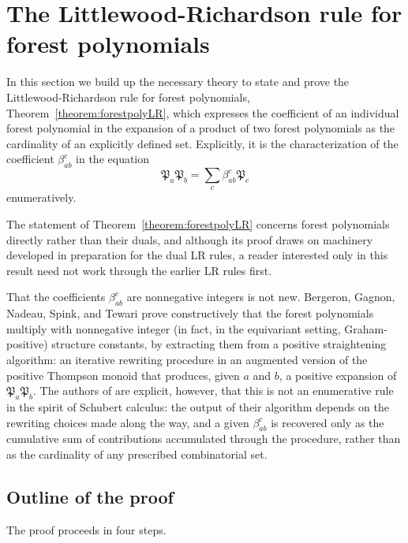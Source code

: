 \documentclass{amsart}
\theoremstyle{definition}
\theoremstyle{remark}
\numberwithin{equation}{subsection}
\newcommand{\forest}{\mathfrak{P}}
\begin{document}
\section{The Littlewood-Richardson rule for forest polynomials}\label{section:forestrule}

In this section we build up the necessary theory to state and prove the Littlewood-Richardson rule for forest polynomials, Theorem~\ref{theorem:forestpolyLR}, which expresses the coefficient of an individual forest polynomial in the expansion of a product of two forest polynomials as the cardinality of an explicitly defined set. Explicitly, it is the characterization of the coefficient $\beta_{ab}^c$ in the equation
$$\forest_a\forest_b = \sum_{c}\beta_{ab}^c\forest_c$$
enumeratively.

The statement of Theorem~\ref{theorem:forestpolyLR} concerns forest polynomials directly rather than their duals, and although its proof draws on machinery developed in preparation for the dual LR rules, a reader interested only in this result need not work through the earlier LR rules first.

That the coefficients $\beta_{ab}^c$ are nonnegative integers is not new. Bergeron, Gagnon, Nadeau, Spink, and Tewari \cite{bergeron2025equivariant} prove constructively that the forest polynomials multiply with nonnegative integer (in fact, in the equivariant setting, Graham-positive) structure constants, by extracting them from a positive straightening algorithm: an iterative rewriting procedure in an augmented version of the positive Thompson monoid that produces, given $a$ and $b$, a positive expansion of $\forest_a \forest_b$. The authors of \cite{bergeron2025equivariant} are explicit, however, that this is not an enumerative rule in the spirit of Schubert calculus: the output of their algorithm depends on the rewriting choices made along the way, and a given $\beta_{ab}^c$ is recovered only as the cumulative sum of contributions accumulated through the procedure, rather than as the cardinality of any prescribed combinatorial set.


\subsection*{Outline of the proof}

The proof proceeds in four steps.
\end{document}
